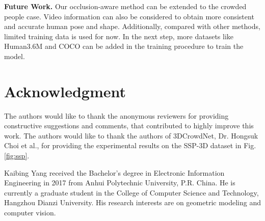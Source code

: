 \documentclass[journal]{IEEEtran}
\begin{document}
\noindent\textbf{Future Work.}  Our occlusion-aware method can be extended to the crowded people case. Video information can also be considered to obtain more consistent and accurate human pose and shape. Additionally, compared with other methods, limited training data is used for now. In the next step, more datasets like Human3.6M and COCO can be added in the training procedure to train the model.






























\section*{Acknowledgment}
 The authors would like to thank the anonymous reviewers for providing constructive suggestions and comments, that contributed to highly improve this work. The authors would like to thank the authors of 3DCrowdNet, Dr. Hongsuk Choi et al., for providing the experimental results on the SSP-3D dataset in Fig. \ref{fig:ssp}.























\begin{IEEEbiography}{Kaibing Yang} received the Bachelor's degree in Electronic Information Engineering in 2017 from Anhui Polytechnic University, P.R. China. He is currently a graduate student in the College of Computer Science and Technology, Hangzhou Dianzi University. His research interests are on geometric modeling and computer vision.
\end{IEEEbiography}
\end{document}
